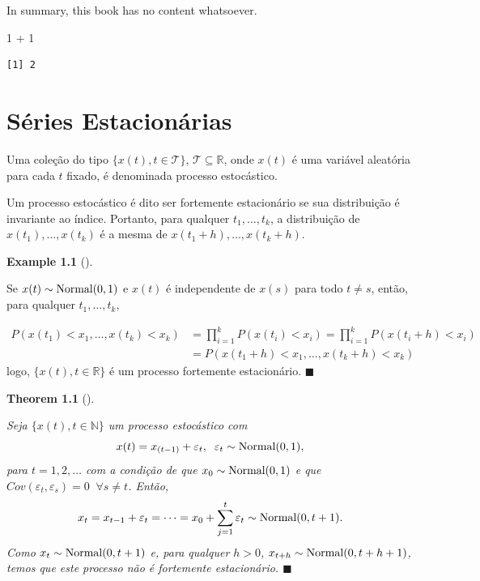 \documentclass[
  letterpaper,
  DIV=11,
  numbers=noendperiod]{scrreprt}
\newenvironment{Shaded}{\begin{snugshade}}{\end{snugshade}}
\newcommand{\DecValTok}[1]{\textcolor[rgb]{0.68,0.00,0.00}{#1}}
\newcommand{\SpecialCharTok}[1]{\textcolor[rgb]{0.37,0.37,0.37}{#1}}
\theoremstyle{definition}
\theoremstyle{plain}
\newtheorem{theorem}{Theorem}[chapter]
\theoremstyle{definition}
\newtheorem{example}{Example}[chapter]
\theoremstyle{remark}
\begin{document}
In summary, this book has no content whatsoever.

\begin{Shaded}
\begin{Highlighting}[]
\DecValTok{1} \SpecialCharTok{+} \DecValTok{1}
\end{Highlighting}
\end{Shaded}

\begin{verbatim}
[1] 2
\end{verbatim}


\hypertarget{suxe9ries-estacionuxe1rias}{%
\chapter{Séries Estacionárias}\label{suxe9ries-estacionuxe1rias}}

Uma coleção do tipo \(\{x(t),t\in\mathcal{T}\}\),
\(\mathcal{T}\subseteq \mathbb{R}\), onde \(x(t)\) é uma variável
aleatória para cada \(t\) fixado, é denominada processo estocástico.

Um processo estocástico é dito ser fortemente estacionário se sua
distribuição é invariante ao índice. Portanto, para qualquer
\(t_1,\ldots,t_k\), a distribuição de \(x(t_1),\ldots,x(t_k)\) é a mesma
de \(x(t_1+h),\ldots,x(t_k+h)\).

\begin{example}[]\protect\hypertarget{exm-serie_estacionaria_1}{}\label{exm-serie_estacionaria_1}

Se \(x(t)\sim \hbox{Normal}(0,1)\) e \(x(t)\) é independente de \(x(s)\)
para todo \(t\neq s\), então, para qualquer \(t_1,\ldots,t_k\),

\[\begin{align}P(x(t_1)<x_1,\ldots,x(t_k)<x_k)&=\prod_{i=1}^k P(x(t_i)<x_i)=\prod_{i=1}^k P(x(t_i+h)<x_i)\\&=P(x(t_1+h)<x_1,\ldots,x(t_k+h)<x_k)\end{align}\]
logo, \(\{x(t),t\in \mathbb{R}\}\) é um processo fortemente
estacionário. \(\blacksquare\)

\end{example}

\begin{theorem}[]\protect\hypertarget{thm-exm_estacionaria2}{}\label{thm-exm_estacionaria2}

Seja \(\{x(t),t\in\mathbb{N}\}\) um processo estocástico com
\[x(t)= x_{(t-1)}+\varepsilon_t,\;\;\varepsilon_t\sim\hbox{Normal}(0,1),\]
para \(t=1,2,\ldots\) com a condição de que
\(x_0\sim\hbox{Normal}(0,1)\) e que
\(Cov(\varepsilon_t,\varepsilon_s)=0\;\;\forall s\neq t\). Então,
\[x_t=x_{t-1}+\varepsilon_{t}=\cdots=x_0+\sum_{j=1}^t\varepsilon_t\sim\hbox{Normal}(0,t+1).\]
Como \(x_t\sim\hbox{Normal}(0,t+1)\) e, para qualquer \(h>0\),
\(x_{t+h}\sim\hbox{Normal}(0,t+h+1)\), temos que este processo não é
fortemente estacionário. \(\blacksquare\)

\end{theorem}
\end{document}
